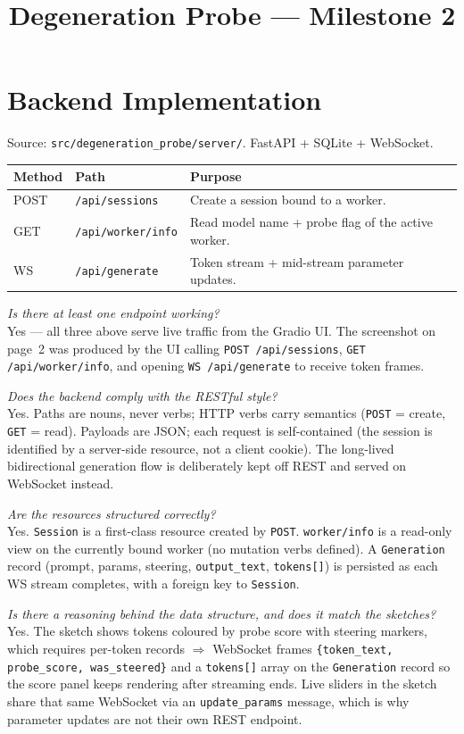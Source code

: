 \documentclass[11pt,a4paper]{article}
\title{\vspace{-1.5cm}\textbf{Degeneration Probe} --- Milestone 2}
\author{}
\date{}
\newcommand{\q}[1]{\textit{#1}\\[-0.3em]}
\begin{document}
\maketitle
\vspace{-2.5em}

\section*{Backend Implementation}

Source: \texttt{src/degeneration\_probe/server/}. FastAPI + SQLite + WebSocket.

\begin{tabularx}{\textwidth}{@{}l l X@{}}
\toprule
\textbf{Method} & \textbf{Path} & \textbf{Purpose} \\
\midrule
POST   & \texttt{/api/sessions}    & Create a session bound to a worker. \\
GET    & \texttt{/api/worker/info} & Read model name + probe flag of the active worker. \\
WS     & \texttt{/api/generate}    & Token stream + mid-stream parameter updates. \\
\bottomrule
\end{tabularx}

\q{Is there at least one endpoint working?}
Yes --- all three above serve live traffic from the Gradio UI. The
screenshot on page~2 was produced by the UI calling \texttt{POST
/api/sessions}, \texttt{GET /api/worker/info}, and opening \texttt{WS
/api/generate} to receive token frames.

\q{Does the backend comply with the RESTful style?}
Yes. Paths are nouns, never verbs; HTTP verbs carry semantics
(\texttt{POST} = create, \texttt{GET} = read). Payloads are JSON; each
request is self-contained (the session is identified by a server-side
resource, not a client cookie). The long-lived bidirectional generation
flow is deliberately kept off REST and served on WebSocket instead.

\q{Are the resources structured correctly?}
Yes. \texttt{Session} is a first-class resource created by
\texttt{POST}. \texttt{worker/info} is a read-only view on the currently
bound worker (no mutation verbs defined). A \texttt{Generation} record
(prompt, params, steering, \texttt{output\_text}, \texttt{tokens[]})
is persisted as each WS stream completes, with a foreign key to
\texttt{Session}.

\q{Is there a reasoning behind the data structure, and does it match the sketches?}
Yes. The sketch shows tokens coloured by probe score with steering
markers, which requires per-token records $\Rightarrow$ WebSocket frames
\texttt{\{token\_text, probe\_score, was\_steered\}} and a
\texttt{tokens[]} array on the \texttt{Generation} record so the score
panel keeps rendering after streaming ends. Live sliders in the sketch
share that same WebSocket via an \texttt{update\_params} message, which
is why parameter updates are not their own REST endpoint.
\end{document}
